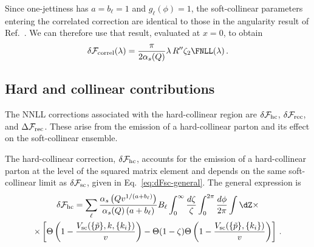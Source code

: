 Since one-jettiness has $a=b_\ell=1$ and $g_\ell(\phi)=1$, the
soft-collinear parameters entering the correlated correction are identical
to those in the angularity result of Ref.~\cite{Banfi:2018mcq}. We can
therefore use that result, evaluated at $x=0$, to obtain
\begin{equation}
\label{eq:dFcorrel-tau_1}
	\delta  \mathcal{F}_{\rm correl}(\lambda)=\frac{\pi}{2\alpha_s(Q)}\lambda\,R'' \zeta_2 \FNLL(\lambda)\,.
\end{equation}

\subsection {Hard and collinear contributions}
\label{sec:hc-contributions}

The NNLL corrections associated with the hard-collinear region are
$\delta\mathcal{F}_{\rm hc}$, $\delta\mathcal{F}_{\rm rec}$, and
$\Delta\mathcal{F}_{\rm rec}$. These arise from the emission of a hard-collinear parton and its
effect on the soft-collinear ensemble. 

The hard-collinear correction, $\delta\mathcal{F}_{\rm hc}$, accounts
for the emission of a hard-collinear parton at the level of the squared matrix element
and depends on the same soft-collinear limit as $\delta\mathcal{F}_{\rm sc}$,
given in Eq.~\eqref{eq:dFsc-general}. The general expression is 
\begin{multline}
  \label{eq:dFhc-general}
   \delta\mathcal{F}_{\rm hc}=\sum_\ell \frac{\alpha_s\left(Qv^{1/(a+b_\ell)}\right)}{\alpha_s(Q)\left(a+b_\ell\right)}B_\ell \int_0^{\infty}\frac{d\zeta}{\zeta}\int_0^{2\pi}\frac{d\phi}{2\pi}
 \int \dZ  \times\\ \times  \left[\Theta\left(1-\frac{V_{\mathrm{sc}}(\{\tilde{p}\},k,\{k_i\})}{v}\right) -\Theta(1-\zeta)\Theta\left(1-\frac{V_{\mathrm{sc}}(\{\tilde{p}\},\{k_i\})}{v}\right)\right]\,.
\end{multline}

